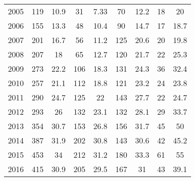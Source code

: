 \begin{table}[htbp]
\begin{tabular}{l*{8}{c}}
2005      &      119&     10.9&       31&     7.33&       70&     12.2&       18&       20\\
2006      &      155&     13.3&       48&     10.4&       90&     14.7&       17&     18.7\\
2007      &      201&     16.7&       56&     11.2&      125&     20.6&       20&     19.8\\
2008      &      207&       18&       65&     12.7&      120&     21.7&       22&     25.3\\
2009      &      273&     22.2&      106&     18.3&      131&     24.3&       36&     32.4\\
2010      &      257&     21.1&      112&     18.8&      121&     23.2&       24&     23.8\\
2011      &      290&     24.7&      125&       22&      143&     27.7&       22&     24.7\\
2012      &      293&       26&      132&     23.1&      132&     28.1&       29&     33.7\\
2013      &      354&     30.7&      153&     26.8&      156&     31.7&       45&       50\\
2014      &      387&     31.9&      202&     30.8&      143&     30.6&       42&     45.2\\
2015      &      453&       34&      212&     31.2&      180&     33.3&       61&       55\\
2016      &      415&     30.9&      205&     29.5&      167&       31&       43&     39.1\\
\hline\hline
\end{tabular}
\end{table}
